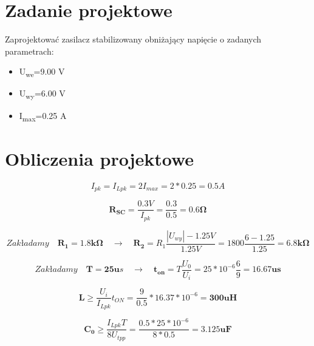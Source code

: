 \documentclass[a4paper,12pt]{article}
\begin{document}
\section{Zadanie projektowe}
Zaprojektować zasilacz stabilizowany obniżający napięcie o zadanych parametrach:
\begin{itemize}
\item U\textsubscript{we}=9.00 V
\item U\textsubscript{wy}=6.00 V
\item I\textsubscript{max}=0.25 A
\end{itemize}
\section{Obliczenia projektowe}

\begin{equation}
  I_{pk}=I_{Lpk}=2I_{max}=2*0.25=0.5 A
\end{equation}

\begin{equation}
  \mathbf{R_{SC}}=\frac{0.3V}{I_{pk}}=\frac{0.3}{0.5}=\mathbf{0.6 \Omega}
\end{equation}

\begin{equation}
  Zakładamy \quad \mathbf{R_1=1.8k\Omega}   \quad \to \quad   \mathbf{R_2}=R_1 \frac {|U_{wy}|-1.25V}{1.25V} = 1800\frac{6-1.25}{1.25}= \mathbf{6.8k \Omega}
\end{equation}

\begin{equation}
  Zakładamy \quad \mathbf{T=25u}s \quad \to \quad \mathbf{t_{on}}=T\frac{U_0}{U_i}=25*10^{-6}\frac{6}{9}=\mathbf{16.67us}
\end{equation}

\begin{equation}
  \mathbf{L}\geq\frac{U_i}{I_{Lpk}}t_{ON}=\frac{9}{0.5}*16.37*10^{-6}=\mathbf{300uH}
\end{equation}

\begin{equation}
\mathbf{C_0}\geq\frac{I_{Lpk}T}{8U_{tpp}}=\frac{0.5*25*10^{-6}}{8*0.5}=\mathbf{3.125uF}
\end{equation}
\newpage
\end{document}
